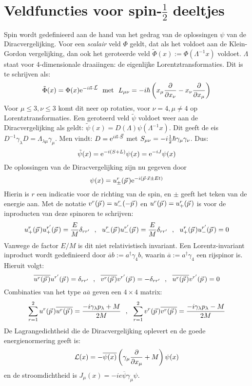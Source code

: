 \section[~~Veldfuncties voor spin-$\frac{1}{2}$ deeltjes]{Veldfuncties voor spin-$\frac{1}{2}$ deeltjes}
Spin wordt gedefinieerd aan de hand van het gedrag van de oplossingen $\psi$
van de Diracvergelijking. Voor een {\it scalair} veld $\Phi$ geldt, dat als
het voldoet aan de Klein-Gordon vergelijking, dan ook het geroteerde veld
$\tilde{\Phi}(x):=\Phi(\Lambda^{-1}x)$ voldoet. $\Lambda$ staat voor
4-dimensionale draaiingen: de eigenlijke Lorentztransformaties. Dit is te
schrijven als:
\[
\tilde{\Phi}(x)=\Phi(x){\rm e}^{-i\vec{n}\cdot\vec{L}}~~\mbox{met}~~
L_{\mu\nu}=-i\hbar\left(x_\mu\frac{\partial }{\partial x_\nu}-x_\nu\frac{\partial }{\partial x_\mu}\right)
\]
Voor $\mu\leq3,\nu\leq3$ komt dit neer op rotaties, voor $\nu=4,\mu\neq4$
op Lorentztransformaties.
\npar
Een geroteerd veld $\tilde{\psi}$ voldoet weer aan de Diracvergelijking
als geldt: $\tilde{\psi}(x)=D(\Lambda)\psi(\Lambda^{-1}x)$. Dit geeft de eis
$D^{-1}\gamma_\lambda D=\Lambda_{\lambda\mu}\gamma_\mu$. Men vindt:
$D={\rm e}^{i\vec{n}\cdot\vec{S}}$ met $S_{\mu\nu}=-i\mbox{$\frac{1}{2}$}\hbar\gamma_\mu\gamma_\nu$.
Dus:
\[
\tilde{\psi}(x)={\rm e}^{-i(S+L)}\psi(x)={\rm e}^{-iJ}\psi(x)
\]
De oplossingen van de Diracvergelijking zijn nu gegeven door
\[
\psi(x)=u_\pm^r(\vec{p}\,){\rm e}^{-i(\vec{p}\cdot\vec{x}\pm Et)}
\]
Hierin is $r$ een indicatie voor de richting van de spin, en $\pm$ geeft het
teken van de energie aan. Met de notatie $v^r(\vec{p}\,)=u^r_-(-\vec{p}\,)$ en
$u^r(\vec{p}\,)=u^r_+(\vec{p}\,)$ is voor de inproducten van deze spinoren te
schrijven:
\[
u_+^r(\vec{p}\,)u_+^{r'}(\vec{p}\,)=\frac{E}{M}\delta_{rr'}~~,~~
u_-^r(\vec{p}\,)u_-^{r'}(\vec{p}\,)=\frac{E}{M}\delta_{rr'}~~,~~
u_+^r(\vec{p}\,)u_-^{r'}(\vec{p}\,)=0
\]
Vanwege de factor $E/M$ is dit niet relativistisch invariant. Een
Lorentz-invariant inproduct wordt gedefinieerd door
$\overline{a}b:=a^\dagger\gamma_4b$, waarin $\overline{a}:=a^\dagger\gamma_4$
een rijspinor is. Hieruit volgt:
\[
\overline{u^r(\vec{p}\,)}u^{r'}(\vec{p}\,)=\delta_{rr'}~~,~~
\overline{v^r(\vec{p}\,)}v^{r'}(\vec{p}\,)=-\delta_{rr'}~~,~~
\overline{u^r(\vec{p}\,)}v^{r'}(\vec{p}\,)=0
\]
Combinaties van het type $a\overline{a}$ geven een $4\times4$ matrix:
\[
\sum_{r=1}^2 u^r(\vec{p}\,)\overline{u^r(\vec{p}\,)}=\frac{-i\gamma_\lambda p_\lambda+M}{2M}~~,~~
\sum_{r=1}^2 v^r(\vec{p}\,)\overline{v^r(\vec{p}\,)}=\frac{-i\gamma_\lambda p_\lambda-M}{2M}
\]
De Lagrangedichtheid die de Diracvergelijking oplevert en de goede
energienormering geeft is:
\[
{\cal L}(x)=-\overline{\psi(x)}\left(\gamma_\mu\frac{\partial }{\partial x_\mu}+M\right)\psi(x)
\]
en de stroomdichtheid is $J_\mu(x)=-ie\overline{\psi}\gamma_\mu\psi$.

